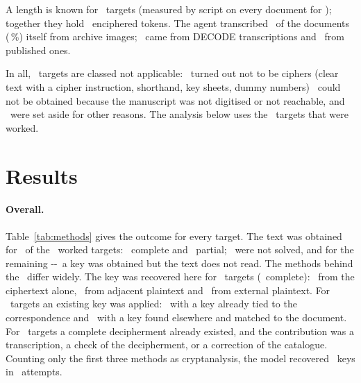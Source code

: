 \documentclass[11pt]{article}
\begin{document}
A length is known for \Nlengthknown\ targets (measured by script on every document for \Nmeasured); together they hold \TokensTotal\ enciphered tokens. The agent transcribed \Ndocsllm\ of the documents (\PctDocsllm\,\%) itself from archive images; \Ndocsdecode\ came from DECODE transcriptions and \Ndocspublished\ from published ones.

In all, \NNA\ targets are classed not applicable: \NnotCipher\ turned out not to be ciphers (clear text with a cipher instruction, shorthand, key sheets, dummy numbers) \NoffLine\ could not be obtained because the manuscript was not digitised or not reachable, and \NnaOther\ were set aside for other reasons. The analysis below uses the \Nworked\ targets that were worked.

\section{Results}
\label{sec:results}

\paragraph{Overall.} Table~\ref{tab:methods} gives the outcome for every target. The text was obtained for \Nobtained\ of the \Nworked\ worked targets: \Ncomplete\ complete and \Npartial\ partial; \NNS\ were not solved, and for the remaining \the\numexpr\Nworked-\Nobtained-\NNS\relax\ a key was obtained but the text does not read. The methods behind the \Nobtained\ differ widely. The key was recovered here for \Nrecovered\ targets (\Nrecoveredcomplete\ complete): \NCT\ from the ciphertext alone, \NAPT\ from adjacent plaintext and \NEPT\ from external plaintext. For \Napplied\ targets an existing key was applied: \NKK\ with a key already tied to the correspondence and \NEK\ with a key found elsewhere and matched to the document. For \Ndeciph\ targets a complete decipherment already existed, and the contribution was a transcription, a check of the decipherment, or a correction of the catalogue. Counting only the first three methods as cryptanalysis, the model recovered \Nrecovered\ keys in \Nworked\ attempts.
\end{document}
